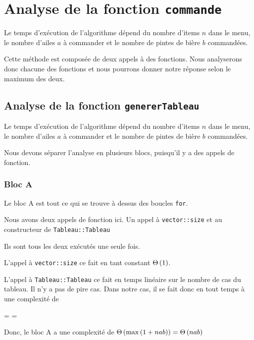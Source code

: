 \documentclass[class=article]{standalone}
\begin{document}
\section*{Analyse de la fonction \lstinline{commande}}

Le temps d'exécution de l'algorithme dépend du nombre d'items $n$ dans le menu,
le nombre d'ailes $a$ à commander et le nombre de pintes de bière $b$ commandées.

Cette méthode est composée de deux appels à des fonctions. Nous analyserons donc
chacune des fonctions et nous pourrons donner notre réponse selon le maximum des deux.

\subsection*{Analyse de la fonction \lstinline{genererTableau} }

Le temps d'exécution de l'algorithme dépend du nombre d'items $n$ dans le menu,
le nombre d'ailes $a$ à commander et le nombre de pintes de bière $b$ commandées.

Nous devons séparer l'analyse en plusieurs blocs, puisqu'il y a des appels de fonction.

\subsubsection*{Bloc A}

Le bloc A est tout ce qui se trouve à dessus des boucles \lstinline{for}.

Nous avons deux appels de fonction ici. Un appel à \lstinline{vector::size} et au constructeur
de \lstinline{Tableau::Tableau}

Ils sont tous les deux exécutés une seule fois.

L'appel à \lstinline{vector::size} ce fait en tant constant $\Theta\left ( 1 \right )$.

L'appel à \lstinline{Tableau::Tableau} ce fait en temps linéaire sur le nombre de cas du tableau.
Il n'y a pas de pire cas.
Dans notre cas, il se fait donc en tout temps à une complexité de
\begin{deriv}
\Theta{}
\<= 
\Theta{} 
\<= 
\Theta{} 
\end{deriv}

Donc, le bloc A a une complexité de $\Theta\left ( \max\left ( 1 + nab \right ) \right ) = \Theta\left ( nab \right )$
\end{document}
